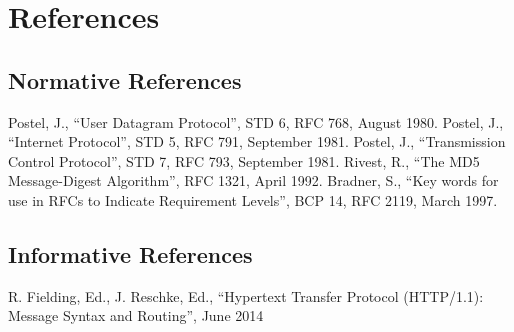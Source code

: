 \chapter{References}

\section{Normative References}

\begingroup
\renewcommand{\chapter}[2]{}
\begin{thebibliography}{}

 Postel, J., ``User Datagram Protocol'', STD 6, RFC 768, August 1980.
 Postel, J., ``Internet Protocol'', STD 5, RFC 791, September 1981.
 Postel, J., ``Transmission Control Protocol'', STD 7, RFC 793, September 1981.
 Rivest, R., ``The MD5 Message-Digest Algorithm'', RFC 1321, April 1992.
 Bradner, S., ``Key words for use in RFCs to Indicate Requirement Levels'', BCP 14, RFC 2119, March 1997.

\end{thebibliography}
\endgroup

\section{Informative References}

\begin{thebibliography}{9}
 R. Fielding, Ed., J. Reschke, Ed., ``Hypertext Transfer Protocol (HTTP/1.1): Message Syntax and Routing'', June 2014
\end{thebibliography}
